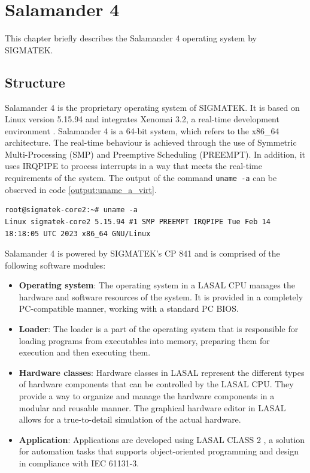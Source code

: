 \documentclass[MMR,Master,english]{twbook}
\begin{document}
\clearpage

\chapter{Salamander 4}\label{cha:salamander4}
This chapter briefly describes the Salamander 4 operating system by SIGMATEK. 

\section{Structure}
\noindent Salamander 4 is the proprietary operating system of SIGMATEK. It is based on Linux version 5.15.94 and integrates Xenomai 3.2, a real-time development environment \cite{XenomaiXenomai}. Salamander 4 is a 64-bit system, which refers to the x86\_64 architecture. The real-time behaviour is achieved through the use of Symmetric Multi-Processing (SMP) and Preemptive Scheduling (PREEMPT). In addition, it uses IRQPIPE to process interrupts in a way that meets the real-time requirements of the system. The output of the command \texttt{uname -a} can be observed in code \ref{output:uname_a_virt}.

\vspace{1em}
\begin{minipage}{0.95\columnwidth}
	\begin{lstlisting}[name={System information},label={output:uname_a_virt}]
root@sigmatek-core2:~# uname -a
Linux sigmatek-core2 5.15.94 #1 SMP PREEMPT IRQPIPE Tue Feb 14 18:18:05 UTC 2023 x86_64 GNU/Linux
\end{lstlisting}
\end{minipage}

\noindent Salamander 4 is powered by SIGMATEK's CP 841 \cite{CPUEinheitenSIGMATEK} and is comprised of the following software modules:

 \begin{itemize}
	\item \textbf{Operating system}: The operating system in a LASAL CPU manages the hardware and software resources of the system. It is provided in a completely PC-compatible manner, working with a standard PC BIOS.
	\item \textbf{Loader}: The loader is a part of the operating system that is responsible for loading programs from executables into memory, preparing them for execution and then executing them.
	\item \textbf{Hardware classes}: Hardware classes in LASAL represent the different types of hardware components that can be controlled by the LASAL CPU. They provide a way to organize and manage the hardware components in a modular and reusable manner. The graphical hardware editor in LASAL allows for a true-to-detail simulation of the actual hardware.
	\item \textbf{Application}: Applications are developed using LASAL CLASS 2 \cite{EngineeringToolLASAL}, a solution for automation tasks that supports object-oriented programming and design in compliance with IEC 61131-3.
\end{itemize}
\end{document}
